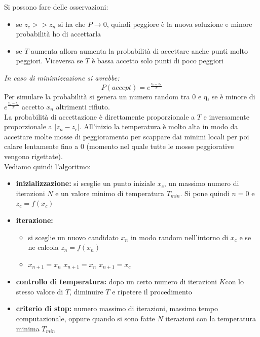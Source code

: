 \message{ !name(ro.tex)}\documentclass[a4paper,12pt, oneside]{book}
\begin{document}
Si possono fare delle osservazioni:
\begin{itemize}
  \item se $z_c>>z_n$ si ha che $P\to 0$, quindi peggiore è la nuova
  soluzione e minore probabilità ho di accettarla
  \item se $𝑇$ aumenta allora aumenta la probabilità di accettare
  anche punti molto peggiori. Viceversa se $T$ è bassa accetto solo
  punti di poco peggiori 
\end{itemize}
\textit{In caso di minimizzazione si avrebbe:}
\[P(accept)=e^{\frac{z_c-z_n}{T}}\]
Per simulare la probabilità si genera un numero random tra 0 e q, se è
minore di $e^{\frac{z_n-z_c}{T}}$ accetto $x_n$ altrimenti rifiuto. \\
La probabilità di accettazione è direttamente proporzionale a $T$ e
inversamente proporzionale a $|z_n-z_c|$. All’inizio la temperatura è
molto alta in modo da accettare molte mosse di peggioramento per
scappare dai minimi locali per poi calare lentamente fino a 0 (momento
nel quale tutte le mosse peggiorative vengono rigettate).\\
Vediamo quindi l'algoritmo:
\begin{itemize}
  \item \textbf{inizializzazione:} si sceglie un punto iniziale $x_c$,
  un massimo numero di iterazioni $N$ e un valore minimo di
  temperatura $T_{min}$. Si pone quindi $n=0$ e $z_c=f(x_c)$
  \item \textbf{iterazione:}
  \begin{itemize}
    \item si sceglie un nuovo candidato $x_n$ in modo random
    nell'intorno di $x_c$ e se ne calcola $z_n=f(x_n)$
    \item
    \begin{algorithmic}
      \State $x_{n+1}=x_n$
      \Else
      \State $x_{n+1}=x_n$
      \Else
      \State $x_{n+1}=x_c$
      \EndIf
      \EndIf
    \end{algorithmic}
  \end{itemize}
  \item \textbf{controllo di temperatura:} dopo un certo numero di
  iterazioni $𝐾$con lo stesso valore di $T$, diminuire $T$ e ripetere
  il procedimento
  \item \textbf{criterio di stop:} numero massimo di iterazioni,
  massimo tempo computazionale, oppure quando si sono fatte
  $N$ iterazioni con la temperatura minima $T_{min}$
\end{itemize}
\end{document}
